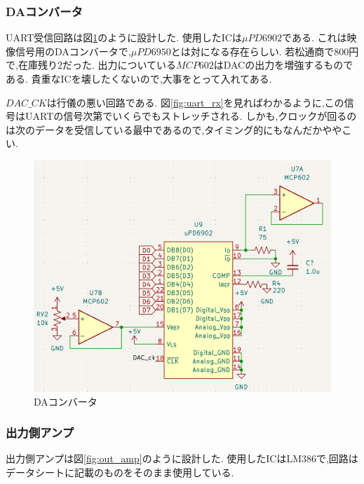 \documentclass[a4paper,10pt]{article}
\begin{document}
\begin{multicols}{2}[\raggedcolumns]
\subsubsection{DAコンバータ}
UART受信回路は図\ref{fig:dac}のように設計した.
使用したICは$\mu PD6902$である.
これは映像信号用のDAコンバータで,$\mu PD6950$とは対になる存在らしい.
若松通商で800円で,在庫残り2だった.
出力についている$MCP602$はDACの出力を増強するものである.
貴重なICを壊したくないので,大事をとって入れてある.

$DAC\_CK$は行儀の悪い回路である.
図\ref{fig:uart_rx}を見ればわかるように,この信号はUARTの信号次第でいくらでもストレッチされる.
しかも,クロックが回るのは次のデータを受信している最中であるので,タイミング的にもなんだかややこい.

\begin{figure}[H]
    \centering
    \includegraphics[width=\linewidth]{figure/dac.png} 
    \caption{DAコンバータ} 
    \label{fig:dac}
\end{figure}

\subsubsection{出力側アンプ}
出力側アンプは図\ref{fig:out_amp}のように設計した.
使用したICはLM386で,回路はデータシートに記載のものをそのまま使用している.


\end{multicols}
\end{document}
